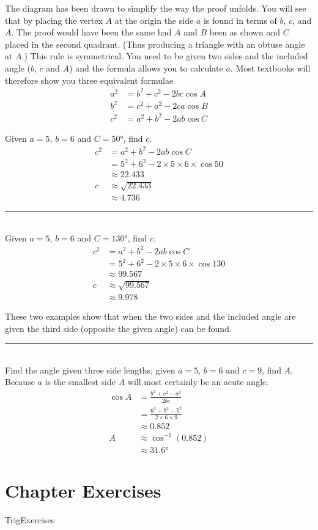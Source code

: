 The diagram has been drawn to simplify the way the proof unfolds. You will see that by placing the vertex $A$ at the origin the side $a$ is found in terms of $b$, $c$, and $A$. The proof would have been the same had $A$ and $B$ been as shown and $C$ placed in the second quadrant. (Thus producing a triangle with an obtuse angle at $A$.) This rule is symmetrical. You need to be given two sides and the included angle ($b$, $c$ and $A$) and the formula allows you to calculate $a$. Most textbooks will therefore show you three equivalent formulae
\begin{align*}a^{2} &  = b^{2} +c^{2} -2 b c \cos  A \\
b^{2} &  = c^{2} +a^{2} -2 c a \cos  B \\
c^{2} &  = a^{2} +b^{2} -2 a b \cos  C\end{align*}

\example Given $a =5$, $b =6$ and $C =\ang{50} $, find $c$.\medskip\\
\solution
\begin{align*}c^{2} &  = a^{2} +b^{2} -2 a b \cos  C \\
&  = 5^{2} +6^{2} -2 \times 5 \times 6 \times \cos  50  \\
&  \approx   22.433 \\
c &  \approx   \sqrt{22.433} \\
&  \approx   4.736 \end{align*}
\rule{6.8cm}{0.5pt}\\
\example Given $a =5$, $b =6$ and $C =\ang{130} $, find $c$.\medskip\\
\solution
\begin{align*}c^{2} &  = a^{2} +b^{2} -2 a b \cos  C \\
&  = 5^{2} +6^{2} -2 \times 5 \times 6 \times \cos  130  \\
&  \approx   99.567 \\
c &  \approx   \sqrt{99.567} \\
&  \approx   9.978\end{align*}

These two examples show that when the two sides and the included angle are given the third side
(opposite the given angle) can be found. \\
\rule{6.8cm}{0.5pt}\\
\example Find the angle given three side lengths; given $a =5$, $b =6$ and $c =9$, find $A$. \medskip\\
\solution Because $a$ is the smallest side $A$ will most certainly be an acute angle.
\begin{align*}\cos  A &  = \frac{b^{2} +c^{2} -a^{2}}{2 b c} \\
&  = \frac{6^{2} +9^{2} -5^{2}}{2 \times 6 \times 9} \\
&  \approx 0.852 \\
A &  \approx \cos ^{ -1} \left (0.852\right ) \\
&  \approx \ang{31.6} 
\end{align*}

\clearpage\section{Chapter Exercises}
{TrigExercises}

